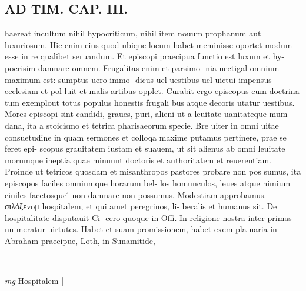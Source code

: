 \documentclass{article}
\begin{document}
\begin{pages}
\section*{AD TIM. CAP. III. }
\marginpar{[ p.126 ]}\pstart haereat incultum nihil hypocriticum, nihil item nouum prophanum aut luxuriosum. Hic enim eius quod ubique  locum habet meminisse oportet modum esse in re qualibet seruandum. Et episcopi praecipua functio est luxum et hy- pocrisim damnare omnem. Frugalitas enim et parsimo- nia uectigal omnium maximum est: sumptus uero immo- dicus uel uestibus uel uictui impensus ecclesiam et pol luit et malis artibus opplet. Curabit ergo episcopus cum doctrina tum exemplout totus populus honestis frugali bus atque decoris utatur uestibus. Mores episcopi sint candidi, graues, puri, alieni ut a leuitate uanitateque mum- dana, ita a stoicismo et tetrica pharisaeorum specie. Bre uiter in omni uitae consuetudine in quam sermones et colloqa maxime putamus pertinere, prae se feret epi- scopus grauitatem iustam et suauem, ut sit alienus ab omni leuitate morumque ineptia quae minuunt doctoris et authoritatem et reuerentiam. Proinde ut tetricos quosdam et misanthropos pastores probare non pos sumus, ita episcopos faciles omniumque horarum bel- los homunculos, leues atque nimium ciuiles facetosque ́ non damnare non possumus. Modestiam approbamus. σιλόξεvoμ hospitalem, et qui amet peregrinos, li- beralis et humanus sit. De hospitalitate disputauit Ci- cero quoque in Offi. In religione nostra inter primas nu meratur uirtutes. Habet et suam promissionem, habet exem pla uaria in Abraham praecipue, Loth, in Sunamitide,  \pend
\vspace{0.5cm}\noindent
\vspace{0.2cm}\rule{1cm}{0.2pt}\\ 
\hspace{0.2cm}\textit{mg}
\footnotesize Hospitalem 
\normalsize| 

\end{pages}
\end{document}

